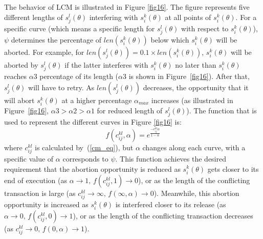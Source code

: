 \documentclass[conference]{IEEEtran}
\begin{document}
The behavior of LCM  is illustrated in Figure \ref{fig16}. The figure represents five different lengths of $s_{j}^{l}(\theta)$
interfering with $s_{i}^{k}(\theta)$ at all points of $s_{i}^{k}(\theta)$.
For a specific curve (which means a specific length for $s_{j}^{l}(\theta)$ with respect to $s_i^k(\theta)$),
$\psi$ determines the percentage of $len(s_{i}^{k}(\theta))$
below which $s_{i}^{k}(\theta)$ will be aborted. For example, for
$len(s_{j}^{l}(\theta))=0.1\times len(s_{i}^{k}(\theta))$, $s_{i}^{k}(\theta)$
will be aborted by $s_{j}^{l}(\theta)$ if the latter interferes with
$s_{i}^{k}(\theta)$ no later than $s_{i}^{k}(\theta)$ reaches $\alpha3$
percentage of its length ($\alpha3$ is shown in Figure~\ref{fig16}). After that, $s_{j}^{l}(\theta)$ will have
to retry. As $len(s_{j}^{l}(\theta))$ decreases, the opportunity
that it will abort $s_{i}^{k}(\theta)$ at a higher percentage $\alpha_{max}$
increases (as illustrated in Figure~\ref{fig16}, $\alpha3>\alpha2>\alpha1$ for reduced length of $s_j^l(\theta)$). The function that is used to represent the 
different curves in Figure \ref{fig16} is:
 \begin{equation}
f(c_{ij}^{kl},\alpha)=e^{\frac{-c_{ij}^{kl}\alpha}{1-\alpha}}\label{eq49}\end{equation}
where $c_{ij}^{kl}$ is calculated by~(\ref{cm_eq}), but $\alpha$ changes
along each curve, with a specific value of $\alpha$ corresponds to $\psi$. This function achieves the desired requirement that the abortion opportunity is reduced as $s_{i}^{k}(\theta)$ gets
closer to its end of execution (as $\alpha\rightarrow1,\, f(c_{ij}^{kl},1)\rightarrow0$),
or as the length of the conflicting transaction is large (as $c_{ij}^{kl}\rightarrow\infty,\, f(\infty,\alpha)\rightarrow0$).
Meanwhile, this abortion opportunity is increased as $s_{i}^{k}(\theta)$
is interfered closer to its release (as $\alpha\rightarrow0,\, f(c_{ij}^{kl},0)\rightarrow1$),
or as the length of the conflicting transaction decreases (as $c_{ij}^{kl}\rightarrow0,\, f(0,\alpha)\rightarrow1$).

\end{document}
